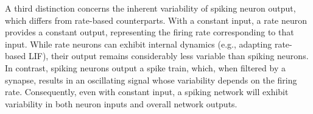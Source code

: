 
\noindent A third distinction concerns the inherent variability of spiking neuron output, which differs from rate-based counterparts. With a constant input, a rate neuron provides a constant output, representing the firing rate corresponding to that input. While rate neurons can exhibit internal dynamics (e.g., adapting rate-based LIF), their output remains considerably less variable than spiking neurons. In contrast, spiking neurons output a spike train, which, when filtered by a synapse, results in an oscillating signal whose variability depends on the firing rate. Consequently, even with constant input, a spiking network will exhibit variability in both neuron inputs and overall network outputs.\\




